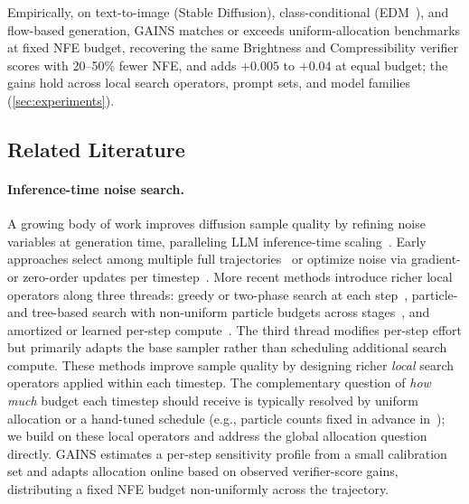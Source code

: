 Empirically, on text-to-image (Stable Diffusion), class-conditional (EDM~\citep{karras2022elucidating}), and flow-based generation, \textsc{GAINS} matches or exceeds uniform-allocation benchmarks at fixed NFE budget, recovering the same Brightness and Compressibility verifier scores with 20--50\% fewer NFE, and adds $+0.005$ to $+0.04$ at equal budget; the gains hold across local search operators, prompt sets, and model families (\cref{sec:experiments}).

\subsection{Related Literature}
\label{sec:related-lit}

\paragraph{Inference-time noise search.}
A growing body of work improves diffusion sample quality by refining noise variables at generation time, paralleling LLM inference-time scaling~\citep{snell2024scaling,brown2024monkeys}.
Early approaches select among multiple full trajectories~\citep{ma2024inference} or optimize noise via gradient- or zero-order updates per timestep~\citep{tang2024dno,qi2024noises,zhou2025golden}.
More recent methods introduce richer local operators along three threads: greedy or two-phase search at each step~\citep{ramesh2025nts,kim2025rbf,zhang2025tscend,lee2025abcd,ttsnap2025}, particle- and tree-based search with non-uniform particle budgets across stages~\citep{singhal2025fk,kim2025psi,zhang2025classical}, and amortized or learned per-step compute~\citep{eyring2025hypernetworks,zhang2025adadiff,ye2025tpdm,yeh2025demons,sundaresha2025vt}.
The third thread modifies per-step effort but primarily adapts the base sampler rather than scheduling additional search compute.
These methods improve sample quality by designing richer \emph{local} search operators applied within each timestep. The complementary question of \emph{how much} budget each timestep should receive is typically resolved by uniform allocation or a hand-tuned schedule (e.g., particle counts fixed in advance in~\citet{singhal2025fk,kim2025psi}); we build on these local operators and address the global allocation question directly.
\textsc{GAINS} estimates a per-step sensitivity profile from a small calibration set and adapts allocation online based on observed verifier-score gains, distributing a fixed NFE budget non-uniformly across the trajectory.

